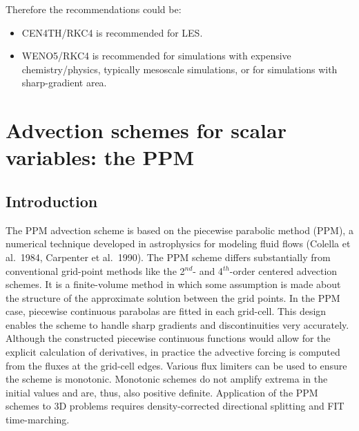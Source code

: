 Therefore the recommendations could be:
\begin{itemize}
 \item CEN4TH/RKC4 is recommended for LES.
 \item WENO5/RKC4 is recommended for simulations with expensive chemistry/physics, typically mesoscale simulations, or for simulations with sharp-gradient area.
\end{itemize}






\section{Advection schemes for scalar variables: the PPM}

\subsection{Introduction}

  The PPM advection scheme is based on the piecewise
  parabolic method (PPM), a numerical technique developed in
  astrophysics for modeling fluid flows (Colella et al.\ 1984, Carpenter
  et al.\ 1990). The PPM scheme differs substantially from conventional
  grid-point methods like the 2$^{nd}$- and 4$^{th}$-order centered advection
  schemes. It is a finite-volume
  method in which some assumption is made about the structure of the
  approximate solution between the grid points. In the PPM case,
  piecewise continuous parabolas are fitted in each grid-cell. This
  design enables the scheme to handle sharp gradients and
  discontinuities very accurately. Although the constructed piecewise
  continuous functions would allow for the explicit calculation of
  derivatives, in practice the advective forcing is computed from the
  fluxes at the grid-cell edges. Various flux limiters can be used to
  ensure the scheme is monotonic. Monotonic schemes do not amplify
  extrema in the initial values and are, thus, also positive
  definite. Application of the PPM schemes to 3D problems requires
  density-corrected directional splitting and FIT time-marching.


